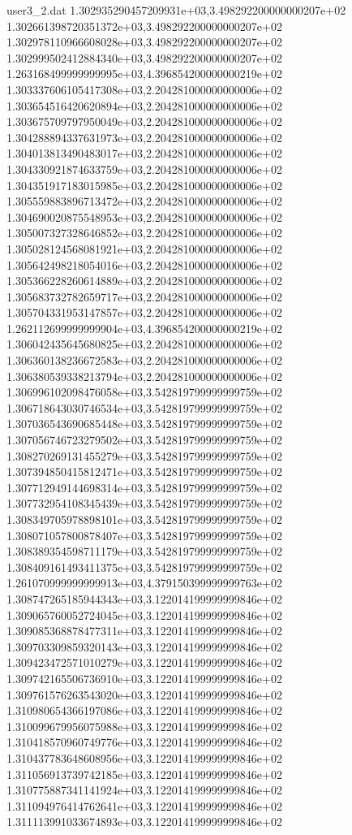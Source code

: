\begin{filecontents}{user3_2.dat}
1.302935290457209931e+03,3.498292200000000207e+02
1.302661398720351372e+03,3.498292200000000207e+02
1.302978110966608028e+03,3.498292200000000207e+02
1.302999502412884340e+03,3.498292200000000207e+02
1.263168499999999995e+03,4.396854200000000219e+02
1.303337606105417308e+03,2.204281000000000006e+02
1.303654516420620894e+03,2.204281000000000006e+02
1.303675709797950049e+03,2.204281000000000006e+02
1.304288894337631973e+03,2.204281000000000006e+02
1.304013813490483017e+03,2.204281000000000006e+02
1.304330921874633759e+03,2.204281000000000006e+02
1.304351917183015985e+03,2.204281000000000006e+02
1.305559883896713472e+03,2.204281000000000006e+02
1.304690020875548953e+03,2.204281000000000006e+02
1.305007327328646852e+03,2.204281000000000006e+02
1.305028124568081921e+03,2.204281000000000006e+02
1.305642498218054016e+03,2.204281000000000006e+02
1.305366228260614889e+03,2.204281000000000006e+02
1.305683732782659717e+03,2.204281000000000006e+02
1.305704331953147857e+03,2.204281000000000006e+02
1.262112699999999904e+03,4.396854200000000219e+02
1.306042435645680825e+03,2.204281000000000006e+02
1.306360138236672583e+03,2.204281000000000006e+02
1.306380539338213794e+03,2.204281000000000006e+02
1.306996102098476058e+03,3.542819799999999759e+02
1.306718643030746534e+03,3.542819799999999759e+02
1.307036543690685448e+03,3.542819799999999759e+02
1.307056746723279502e+03,3.542819799999999759e+02
1.308270269131455279e+03,3.542819799999999759e+02
1.307394850415812471e+03,3.542819799999999759e+02
1.307712949144698314e+03,3.542819799999999759e+02
1.307732954108345439e+03,3.542819799999999759e+02
1.308349705978898101e+03,3.542819799999999759e+02
1.308071057800878407e+03,3.542819799999999759e+02
1.308389354598711179e+03,3.542819799999999759e+02
1.308409161493411375e+03,3.542819799999999759e+02
1.261070999999999913e+03,4.379150399999999763e+02
1.308747265185944343e+03,3.122014199999999846e+02
1.309065760052724045e+03,3.122014199999999846e+02
1.309085368878477311e+03,3.122014199999999846e+02
1.309703309859320143e+03,3.122014199999999846e+02
1.309423472571010279e+03,3.122014199999999846e+02
1.309742165506736910e+03,3.122014199999999846e+02
1.309761576263543020e+03,3.122014199999999846e+02
1.310980654366197086e+03,3.122014199999999846e+02
1.310099679956075988e+03,3.122014199999999846e+02
1.310418570960749776e+03,3.122014199999999846e+02
1.310437783648608956e+03,3.122014199999999846e+02
1.311056913739742185e+03,3.122014199999999846e+02
1.310775887341141924e+03,3.122014199999999846e+02
1.311094976414762641e+03,3.122014199999999846e+02
1.311113991033674893e+03,3.122014199999999846e+02

\end{filecontents}
